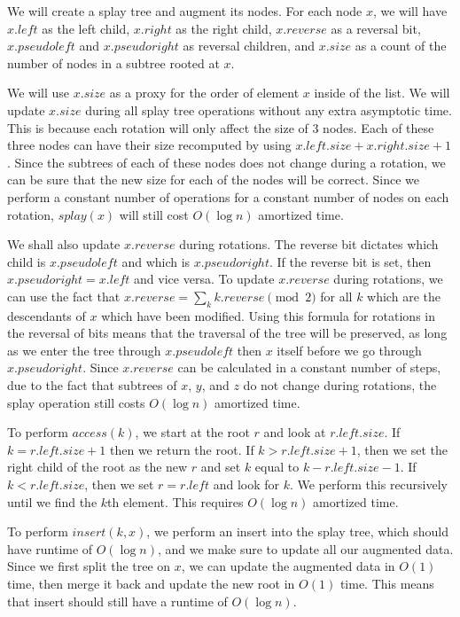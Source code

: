 \documentclass[psamsfonts]{amsart}
\newenvironment{sol}{\vspace{0.25cm}{\large \bfseries Solution:}}{\qedsymbol}
\begin{document}
\begin{sol}
We will create a splay tree and augment its nodes. For each node $x$, we will have $x.left$ as the left child, $x.right$ as the right child, $x.reverse$ as a reversal bit, $x.pseudoleft$ and $x.pseudoright$ as reversal children, and $x.size$ as a count of the number of nodes in a subtree rooted at $x$. 

We will use $x.size$ as a proxy for the order of element $x$ inside of the list. We will update $x.size$ during all splay tree operations without any extra asymptotic time. This is because each rotation will only affect the size of 3 nodes. Each of these three nodes can have their size recomputed by using $x.left.size + x.right.size + 1$. Since the subtrees of each of these nodes does not change during a rotation, we can be sure that the new size for each of the nodes will be correct. Since we perform a constant number of operations for a constant number of nodes on each rotation, $splay(x)$ will still cost $O(\log n)$ amortized time. 

We shall also update $x.reverse$ during rotations. The reverse bit dictates which child is $x.pseudoleft$ and which is $x.pseudoright$. If the reverse bit is set, then $x.pseudoright = x.left$ and vice versa. To update $x.reverse$ during rotations, we can use the fact that $x.reverse = \sum_{k} k.reverse \pmod{2}$ for all $k$ which are the descendants of $x$ which have been modified. Using this formula for rotations in the reversal of bits means that the traversal of the tree will be preserved, as long as we enter the tree through $x.pseudoleft$ then $x$ itself before we go through $x.pseudoright$. Since $x.reverse$ can be calculated in a constant number of steps, due to the fact that subtrees of $x$, $y$, and $z$ do not change during rotations, the splay operation still costs $O(\log n)$ amortized time.

To perform $access(k)$, we start at the root $r$ and look at $r.left.size$. If $k = r.left.size + 1$ then we return the root. If $k > r.left.size + 1$, then we set the right child of the root as the new $r$ and set $k$ equal to $k - r.left.size - 1$. If $k < r.left.size$, then we set $r = r.left$ and look for $k$. We perform this recursively until we find the $k$th element. This requires $O(\log n)$ amortized time. 

To perform $insert(k,x)$, we perform an insert into the splay tree, which should have runtime of $O(\log n)$, and we make sure to update all our augmented data. Since we first split the tree on $x$, we can update the augmented data in $O(1)$ time, then merge it back and update the new root in $O(1)$ time. This means that insert should still have a runtime of $O(\log n)$. 


\end{sol}
\end{document}
